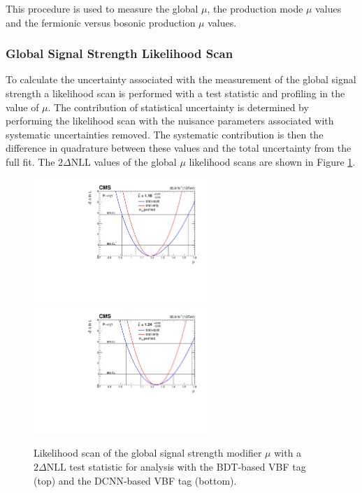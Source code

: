 This procedure is used to measure the global $\mu$, the production mode $\mu$ values and the fermionic versus bosonic production $\mu$ values. 

\subsubsection{Global Signal Strength Likelihood Scan}
To calculate the uncertainty associated with the measurement of the global signal strength a likelihood scan is performed with a test statistic and profiling in the value of $\mu$.
The contribution of statistical uncertainty is determined by performing the likelihood scan with the nuisance parameters associated with systematic uncertainties removed. 
The systematic contribution is then the difference in quadrature between these values and the total uncertainty from the full fit. 
The $2\Delta{\mathrm{NLL}}$ values of the global $\mu$ likelihood scans are shown in Figure \ref{fig:stats_results:global_mu_scan}.
\begin{figure}[h!]
    \begin{center}
        \includegraphics[width=0.6\textwidth]{figures/stats_results/CMS-HIG-16-040_Figure_016.pdf}
        \includegraphics[width=0.6\textwidth]{figures/stats_results/MuScanProfileMH.pdf}
    \end{center}
    \caption{Likelihood scan of the global signal strength modifier $\mu$ with a $2\Delta{\mathrm{NLL}}$ test statistic for analysis with the BDT-based VBF tag (top) and the DCNN-based VBF tag (bottom).}
        \label{fig:stats_results:global_mu_scan}
\end{figure}

